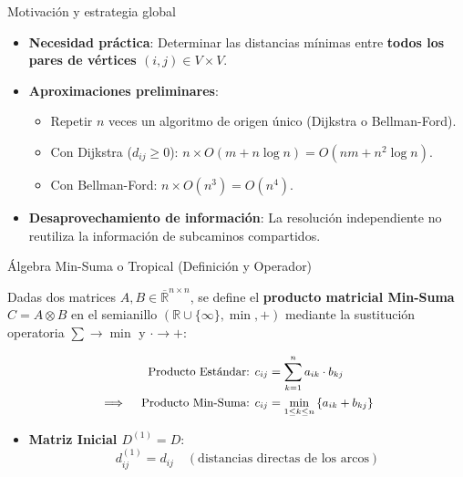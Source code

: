 \documentclass[
  ignorenonframetext,
]{beamer}
\providecommand{\tightlist}{%
  \setlength{\itemsep}{0pt}\setlength{\parskip}{0pt}}
\begin{document}
\begin{frame}{Motivación y estrategia global}
\label{motivaciuxf3n-y-estrategia-global}
\begin{itemize}
\item
  \textbf{Necesidad práctica}: Determinar las distancias mínimas entre
  \textbf{todos los pares de vértices \((i, j) \in V \times V\)}.
\item
  \textbf{Aproximaciones preliminares}:

  \begin{itemize}
  \tightlist
  \item
    Repetir \(n\) veces un algoritmo de origen único (Dijkstra o
    Bellman-Ford).
  \item
    Con Dijkstra (\(d_{ij} \ge 0\)):
    \(n \times O(m + n \log n) = O(nm + n^2 \log n)\).
  \item
    Con Bellman-Ford: \(n \times O(n^3) = O(n^4)\).
  \end{itemize}
\item
  \textbf{Desaprovechamiento de información}: La resolución
  independiente no reutiliza la información de subcaminos compartidos.
\end{itemize}
\end{frame}

\begin{frame}{Álgebra Min-Suma o Tropical (Definición y Operador)}
\label{uxe1lgebra-min-suma-o-tropical-definiciuxf3n-y-operador}
\begin{tcolorbox}[enhanced jigsaw, colframe=quarto-callout-note-color-frame, toptitle=1mm, colback=white, colbacktitle=quarto-callout-note-color!10!white, titlerule=0mm, breakable, coltitle=black, opacityback=0, bottomrule=.15mm, title=\textcolor{quarto-callout-note-color}{\faInfo}\hspace{0.5em}{Producto matricial Min-Suma}, rightrule=.15mm, arc=.35mm, leftrule=.75mm, left=2mm, toprule=.15mm, bottomtitle=1mm, opacitybacktitle=0.6]

Dadas dos matrices \(A, B \in \overline{\mathbb{R}}^{n \times n}\), se
define el \textbf{producto matricial Min-Suma} \(C = A \otimes B\) en el
semianillo \((\mathbb{R} \cup \{\infty\}, \min, +)\) mediante la
sustitución operatoria \(\sum \to \min\) y \(\cdot \to +\):

\[ \small
\begin{aligned}
\text{Producto Estándar: } & c_{ij} = \sum_{k=1}^n a_{ik} \cdot b_{kj} \\
\implies \quad \text{Producto Min-Suma: } & c_{ij} = \min_{1 \le k \le n} \left\{ a_{ik} + b_{kj} \right\}
\end{aligned}
\]

\end{tcolorbox}

\begin{itemize}
\tightlist
\item
  \textbf{Matriz Inicial \(D^{(1)} = D\)}:
  \[d_{ij}^{(1)} = d_{ij} \quad (\text{distancias directas de los arcos})\]
\end{itemize}
\end{frame}
\end{document}
